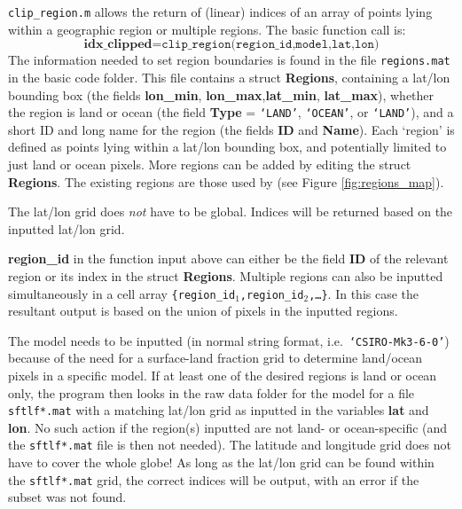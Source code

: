 \documentclass{article}
\begin{document}
\texttt{clip\_region.m} allows the return of (linear) indices of an array of points lying within a geographic region or multiple regions. The basic function call is:
\begin{equation}
\textbf{idx\_clipped} = \texttt{clip\_region(region\_id,model,lat,lon)}
\end{equation}
The information needed to set region boundaries is found in the file \texttt{regions.mat} in the basic code folder. This file contains a struct \textbf{Regions}, containing a lat/lon bounding box (the fields \textbf{lon\_min}, \textbf{lon\_max},\textbf{lat\_min}, \textbf{lat\_max}), whether the region is land or ocean (the field \textbf{Type} = \texttt{`LAND'}, \texttt{`OCEAN'}, or \texttt{`LAND'}), and a short ID and long name for the region (the fields \textbf{ID} and \textbf{Name}). Each `region' is defined as points lying within a lat/lon bounding box, and potentially limited to just land or ocean pixels. More regions can be added by editing the struct \textbf{Regions}. The existing regions are those used by \cite{castruccio_statistical_2013} (see Figure \ref{fig:regions_map}). 

The lat/lon grid does \textit{not} have to be global. Indices will be returned based on the inputted lat/lon grid.

\textbf{region\_id} in the function input above can either be the field \textbf{ID} of the relevant region or its index in the struct \textbf{Regions}. Multiple regions can also be inputted simultaneously in a cell array \texttt{\{region\_id$_1$,region\_id$_2$,\dots\}}. In this case the resultant output is based on the union of pixels in the inputted regions.  

The model needs to be inputted (in normal string format, i.e.\ \texttt{`CSIRO-Mk3-6-0'}) because of the need for a surface-land fraction grid to determine land/ocean pixels in a specific model. If at least one of the desired regions is land or ocean only, the program then looks in the raw data folder for the model for a file \texttt{sftlf*.mat} with a matching lat/lon grid as inputted in the variables \textbf{lat} and \textbf{lon}. No such action if the region(s) inputted are not land- or ocean-specific (and the \texttt{sftlf*.mat} file is then not needed). The latitude and longitude grid does not have to cover the whole globe! As long as the lat/lon grid can be found within the \texttt{sftlf*.mat} grid, the correct indices will be output, with an error if the subset was not found. 
\end{document}
